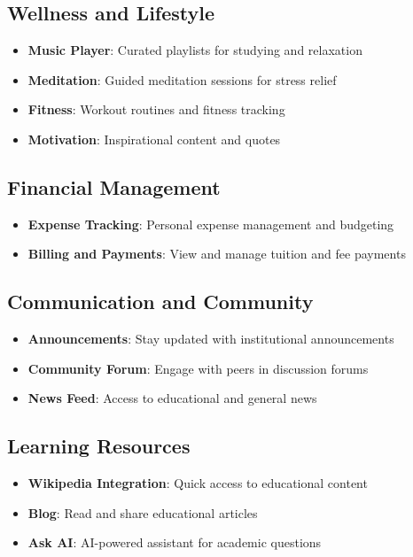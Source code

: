 \subsection{Wellness and Lifestyle}

\begin{itemize}
    \item \textbf{Music Player}: Curated playlists for studying and relaxation
    \item \textbf{Meditation}: Guided meditation sessions for stress relief
    \item \textbf{Fitness}: Workout routines and fitness tracking
    \item \textbf{Motivation}: Inspirational content and quotes
\end{itemize}

\subsection{Financial Management}

\begin{itemize}
    \item \textbf{Expense Tracking}: Personal expense management and budgeting
    \item \textbf{Billing and Payments}: View and manage tuition and fee payments
\end{itemize}

\subsection{Communication and Community}

\begin{itemize}
    \item \textbf{Announcements}: Stay updated with institutional announcements
    \item \textbf{Community Forum}: Engage with peers in discussion forums
    \item \textbf{News Feed}: Access to educational and general news
\end{itemize}

\subsection{Learning Resources}

\begin{itemize}
    \item \textbf{Wikipedia Integration}: Quick access to educational content
    \item \textbf{Blog}: Read and share educational articles
    \item \textbf{Ask AI}: AI-powered assistant for academic questions
\end{itemize}

